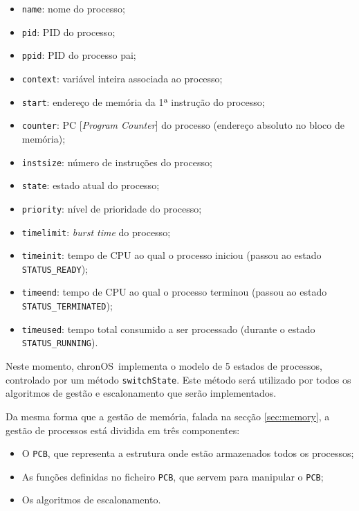 \documentclass[a4paper,11pt,onecolumn,oneside]{article}
\newcommand{\chronOS}{\textsf{chronOS}}
\begin{document}
	\begin{itemize}
		\item \verb|name|: nome do processo;
		\item \verb|pid|: \ac{PID} do processo;
		\item \verb|ppid|: PID do processo pai;
		\item \verb|context|: variável inteira associada ao processo;
		\item \verb|start|: endereço de memória da 1ª instrução do processo;
		\item \verb|counter|: PC [\textit{Program Counter}] do processo (endereço absoluto no bloco de memória);
		\item \verb|instsize|: número de instruções do processo;
		\item \verb|state|: estado atual do processo;
		\item \verb|priority|: nível de prioridade do processo;
		\item \verb|timelimit|: \textit{burst time} do processo;
		\item \verb|timeinit|: tempo de CPU ao qual o processo iniciou (passou ao estado \texttt{STATUS\_READY});
		\item \verb|timeend|: tempo de CPU ao qual o processo terminou (passou ao estado \texttt{STATUS\_TERMINATED});
		\item \verb|timeused|: tempo total consumido a ser processado (durante o estado \texttt{STATUS\_RUNNING}).
	\end{itemize}
	
	Neste momento, \chronOS~implementa o modelo de 5 estados de processos, controlado por um método \verb|switchState|. Este método será utilizado por todos os algoritmos de gestão e escalonamento que serão implementados.
	
	Da mesma forma que a gestão de memória, falada na secção \ref{sec:memory}, a gestão de processos está dividida em três componentes:
	
	\begin{itemize} %
	    \item O \texttt{\ac{PCB}}, que representa a estrutura onde estão armazenados todos os processos;
	    \item As funções definidas no ficheiro \texttt{\ac{PCB}}, que servem para manipular o \texttt{\ac{PCB}};
	    \item Os algoritmos de escalonamento.
	\end{itemize}  
	
\end{document}
